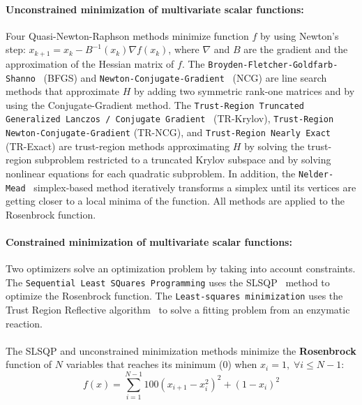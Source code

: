 \documentclass[11pt]{article}
\newcommand{\tristan}[1]{\color{orange}\textbf{From Tristan:} #1\color{black}\xspace}
\begin{document}
\paragraph{Unconstrained minimization of multivariate scalar functions:}
Four Quasi-Newton-Raphson methods minimize function $f$ by using Newton's step: $x_{k+1} = x_{k} - B^{-1}(x_k)\nabla f(x_k)$, where $\nabla$ and $B$ are the gradient and the approximation of the Hessian matrix of $f$. The \texttt{Broyden-Fletcher-Goldfarb-Shanno}~\cite{BFGS} (BFGS) and \texttt{Newton-Conjugate-Gradient}~\cite{nocedal2006numerical} (NCG) are line search methods that approximate $H$ by adding two symmetric rank-one matrices and by using the Conjugate-Gradient method. The \texttt{Trust-Region Truncated Generalized Lanczos / Conjugate Gradient}~\cite{gould1999solving} (TR-Krylov), \texttt{Trust-Region Newton-Conjugate-Gradient} (TR-NCG), and \texttt{Trust-Region Nearly Exact}~\cite{nocedal2006numerical} (TR-Exact) are trust-region methods approximating $H$ by solving the trust-region subproblem restricted to a truncated Krylov subspace and by solving nonlinear equations for each quadratic subproblem. 
In addition, the \texttt{Nelder-Mead}~\cite{singer2009nelder} simplex-based method iteratively transforms a simplex until its vertices are getting closer to a local minima of the function. All methods are applied to the Rosenbrock function.

\paragraph{Constrained minimization of multivariate scalar functions:}
Two optimizers solve an optimization problem by taking into account constraints.
The \texttt{Sequential Least SQuares Programming} uses the SLSQP~\cite{kraft1988software} method to optimize the Rosenbrock function.
The \texttt{Least-squares minimization} uses the Trust Region Reflective algorithm~\cite{li1993centering}
to solve a fitting problem from an enzymatic reaction.

\paragraph{}
The SLSQP and unconstrained minimization methods minimize the \textbf{Rosenbrock} function of $N$ variables
that reaches its minimum (0) when $x_i=1,\; \forall i \leq N-1$:
\[f(x) = \sum_{i=1}^{N-1} 100(x_{i+1}-x^2_i)^2 + (1-x_i)^2\]
\end{document}
